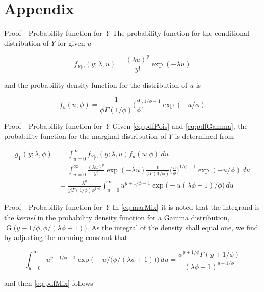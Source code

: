 \documentclass[aspectratio=169]{beamer}
\DeclareMathOperator{\G}{G}
\begin{document}
\hypertarget{appendix}{%
\section{Appendix}\label{appendix}}

\begin{frame}{Proof - Probability function for \emph{Y}}
\protect\hypertarget{proof---probability-function-for-y}{}
The probability function for the conditional distribution of \(Y\) for
given \(u\)

\begin{equation} \label{eq:pdfPois}
  f_{Y|u}(y;\lambda, u)=\frac{(\lambda u)^y}{y!} \exp (-\lambda u)
\end{equation}

and the probability density function for the distribution of \(u\) is

\begin{equation} \label{eq:pdfGamma}
  f_{u}(u;\phi)=\frac{1}{\phi \Gamma(1/\phi)} \bigg(\frac{u}{\phi}\bigg)^{1/\phi-1} \exp (-u/\phi)
\end{equation}
\end{frame}

\begin{frame}{Proof - Probability function for \emph{Y}}
\protect\hypertarget{proof---probability-function-for-y-1}{}
Given \eqref{eq:pdfPois} and \eqref{eq:pdfGamma}, the probability
function for the marginal distribution of \(Y\) is determined from

\begin{equation} \label{eq:marMix}
  \begin{aligned}
    g_{Y}(y;\lambda,\phi)&=\int_{u=0}^\infty f_{Y|u}(y;\lambda, u) f_{u}(u;\phi) \,du \\
    &=\int_{u=0}^\infty \frac{(\lambda u)^y}{y!} \exp (-\lambda u) \frac{1}{\phi \Gamma(1/\phi)} \bigg(\frac{u}{\phi}\bigg)^{1/\phi-1} \exp (-u/\phi) \,du\\
    &=\frac{\lambda^{y}}{y!\Gamma(1/\phi)\phi^{1/\phi}} \int_{u=0}^\infty u^{y+1/\phi-1} \exp \big(-u(\lambda \phi+1)/\phi\big) \,du
  \end{aligned}
\end{equation}
\end{frame}

\begin{frame}{Proof - Probability function for \emph{Y}}
\protect\hypertarget{proof---probability-function-for-y-2}{}
In \eqref{eq:marMix} it is noted that the integrand is the \emph{kernel}
in the probability density function for a Gamma distribution,
\(\G\big(y+1/\phi,\phi/(\lambda \phi+1)\big)\). As the integral of the
density shall equal one, we find by adjusting the norming constant that

\begin{equation}
  \int_{u=0}^\infty u^{y+1/\phi-1} \exp \bigg(-u/\Big(\phi/(\lambda \phi+1)\Big)\bigg) \,du = \frac{\phi^{y+1/\phi}\Gamma(y+1/\phi)}{(\lambda \phi + 1)^{y+1/\phi}}
\end{equation}

and then \eqref{eq:pdfMix} follows
\end{frame}
\end{document}
